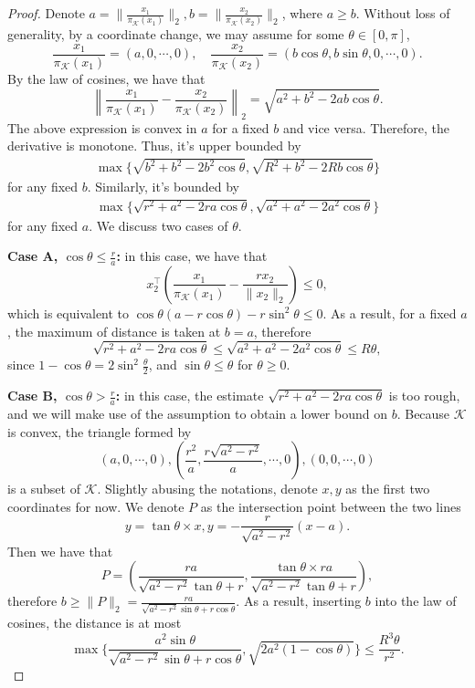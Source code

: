 \begin{proof}
Denote $a=\|\frac{x_1}{\pi_{\mathcal{K}}(x_1)}\|_2, b= \|\frac{x_2}{\pi_{\mathcal{K}}(x_2)}\|_2$, where $a\ge b$. Without loss of generality, by a coordinate change, we may assume for some $\theta\in[0,\pi]$, 
$$
\frac{x_1}{\pi_{\mathcal{K}}(x_1)}=(a,0,\cdots, 0), \quad \frac{x_2}{\pi_{\mathcal{K}}(x_2)}=(b\cos\theta,b\sin \theta, 0, \cdots, 0).
$$
By the law of cosines, we have that
$$
\left\|\frac{x_1}{\pi_{\mathcal{K}}(x_1)}-\frac{x_2}{\pi_{\mathcal{K}}(x_2)}\right\|_2=\sqrt{a^2+b^2-2ab\cos \theta}.
$$
The above expression is convex in $a$ for a fixed $b$ and vice versa. Therefore, the derivative is monotone. Thus, it's upper bounded by 
\begin{align*}
\max\{\sqrt{b^2+b^2-2b^2\cos \theta},\sqrt{R^2+b^2-2Rb\cos \theta}\}
\end{align*}
for any fixed $b$. Similarly, it's bounded by 
\begin{align*}
\max\{\sqrt{r^2+a^2-2ra\cos \theta},\sqrt{a^2+a^2-2a^2\cos \theta}\}
\end{align*}
for any fixed $a$. We discuss two cases of $\theta$.

\textbf{Case A, $\cos \theta\le \frac{r}{a}$:}
in this case, we have that
$$
x_2^{\top}(\frac{x_1}{\pi_{\mathcal{K}}(x_1)}-\frac{rx_2}{\|x_2\|_2})\le 0,
$$
which is equivalent to $\cos \theta(a-r\cos \theta)-r\sin^2 \theta\le 0$. As a result, for a fixed $a$, the maximum of distance is taken at $b=a$, therefore
$$
\sqrt{r^2+a^2-2ra\cos \theta}\le \sqrt{a^2+a^2-2a^2\cos \theta}\le R\theta,
$$
since $1-\cos \theta=2\sin^2 \frac{\theta}{2}$, and $\sin \theta\le \theta$ for $\theta\ge 0$.

\textbf{Case B, $\cos \theta> \frac{r}{a}$:} 
in this case, the estimate $\sqrt{r^2+a^2-2ra\cos \theta}$ is too rough, and we will make use of the assumption to obtain a lower bound on $b$.
Because $\mathcal{K}$ is convex, the triangle formed by 
$$(a,0,\cdots, 0),(\frac{r^2}{a},\frac{r\sqrt{a^2-r^2}}{a},\cdots, 0),(0,0,\cdots, 0)$$
is a subset of $\mathcal{K}$. Slightly abusing the notations, denote $x,y$ as the first two coordinates for now. We denote $P$ as the intersection point between the two lines
$$
y=\tan \theta \times x, y=-\frac{r}{\sqrt{a^2-r^2}}(x-a).
$$
Then we have that
$$
P=(\frac{ra}{\sqrt{a^2-r^2}\tan \theta+r},\frac{\tan \theta \times ra}{\sqrt{a^2-r^2}\tan \theta+r}),
$$
therefore $b\ge \|P\|_2=\frac{ra}{\sqrt{a^2-r^2}\sin \theta +r\cos \theta}$. As a result, inserting $b$ into the law of cosines, the distance is at most
$$
\max\{\frac{a^2\sin \theta}{\sqrt{a^2-r^2}\sin \theta +r\cos \theta}, \sqrt{2a^2(1-\cos \theta)}\}\le \frac{R^3 \theta}{r^2}.
$$


\end{proof}
